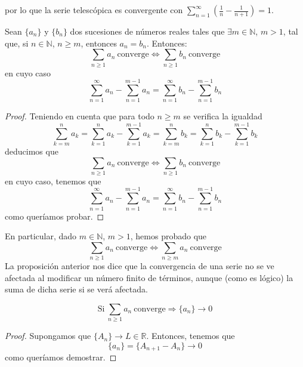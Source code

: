 por lo que la serie telescópica es convergente con $\displaystyle\sum_{n = 1}^{\infty} \left(\frac{1}{n} - \frac{1}{n+1}\right) = 1$.

\begin{prop}
    Sean $\{a_n\}$ y $\{b_n\}$ dos sucesiones de números reales tales que $\exists m \in \mathbb{N}$, $m >1$, tal que, si $n \in \mathbb{N}$, $n \geq m$, entonces $a_n = b_n$. Entonces:
    \begin{equation*}
        \sum_{n \geq 1} a_n ~ \text{converge} \Longleftrightarrow
        \sum_{n \geq 1} b_n ~ \text{converge}
    \end{equation*}
    en cuyo caso
    \begin{equation*}
        \sum_{n = 1}^{\infty} a_n - \sum_{n = 1}^{m-1} a_n =
        \sum_{n = 1}^{\infty} b_n - \sum_{n = 1}^{m-1} b_n
    \end{equation*}
\end{prop}
\begin{proof}
    Teniendo en cuenta que para todo $n \geq m$ se verifica la igualdad
    \begin{equation*}
        \sum_{k = m}^{n} a_k
        = \sum_{k = 1}^{n} a_k - \sum_{k = 1}^{m-1} a_k 
        = \sum_{k = m}^{n} b_k
        = \sum_{k = 1}^{n} b_k - \sum_{k = 1}^{m-1} b_k
    \end{equation*}
    deducimos que
    \begin{equation*}
        \sum_{n \geq 1} a_n ~ \text{converge} \Longleftrightarrow 
        \sum_{n \geq 1} b_n ~ \text{converge}
    \end{equation*}
    en cuyo caso, tenemos que
    \begin{equation*}
        \sum_{n = 1}^{\infty} a_n - \sum_{n = 1}^{m-1} a_n
        = \sum_{n = 1}^{\infty} b_n - \sum_{n = 1}^{m-1} b_n
    \end{equation*}
    como queríamos probar.
\end{proof}


En particular, dado $m \in \mathbb{N}$, $m >1$, hemos probado que
\begin{equation*}
    \displaystyle\sum_{n \geq 1} a_n ~ \text{converge} \Longleftrightarrow \displaystyle\sum_{n \geq m} a_n ~ \text{converge}
\end{equation*}
La proposición anterior nos dice que la convergencia de una serie no se ve afectada al modificar un número finito de términos, aunque (como es lógico) la suma de dicha serie si se verá afectada.

\begin{prop}
    \begin{equation*}
       \text{Si} ~ \displaystyle\sum_{n \geq 1} a_n ~ \text{converge} \Longrightarrow \{a_n\} \longrightarrow 0
    \end{equation*}
\end{prop}
\begin{proof}
    Supongamos que $\{A_n\} \longrightarrow L \in \mathbb{R}$. Entonces, tenemos que
    \begin{equation*}
        \{a_n\} = \{A_{n+1} - A_n\} \longrightarrow 0
    \end{equation*}
    como queríamos demostrar.
\end{proof}